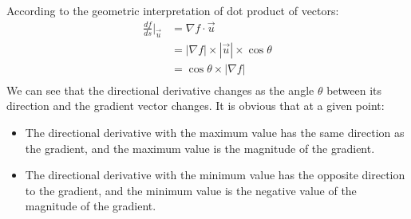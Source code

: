 \documentclass{article}
\begin{document}
According to the geometric interpretation of dot product of vectors:
\begin{equation*}
  \begin{split}
    \frac{df}{ds}|_{\vec{u}} &= \nabla f \cdot \vec{u} \\
                             &= |\nabla f| \times |\vec{u}| \times \cos\theta \\
                             &= \cos\theta \times |\nabla f| \\
  \end{split}
\end{equation*}
We can see that the directional derivative changes as the angle $\theta$ between 
its direction and the gradient vector changes. It is obvious that at a given 
point:
\begin{itemize}
  \item The directional derivative with the maximum value has the same direction 
    as the gradient, and the maximum value is the magnitude of the gradient.
  \item The directional derivative with the minimum value has the opposite 
    direction to the gradient, and the minimum value is the negative value of 
    the magnitude of the gradient.
\end{itemize}
\end{document}
